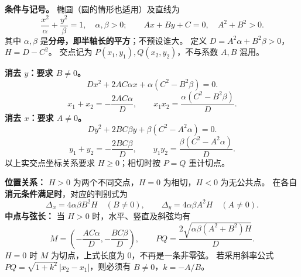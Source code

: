 \begin{statementbox}
\textbf{条件与记号。} 椭圆（圆的情形也适用）及直线为
\[
 \frac{x^2}{\alpha}+\frac{y^2}{\beta}=1,\quad \alpha,\beta>0;
 \qquad Ax+By+C=0,\quad A^2+B^2>0.
\]
其中 $\alpha,\beta$ 是\textbf{分母，即半轴长的平方}；不预设谁大。
定义 $D=A^2\alpha+B^2\beta>0$，$H=D-C^2$。
交点记为 $P(x_1,y_1),Q(x_2,y_2)$，不与系数 $A,B$ 混用。

\textbf{消去 $y$：要求 $B\ne0$。}
\[
 Dx^2+2AC\alpha x+\alpha(C^2-B^2\beta)=0.
\]
\[
 \boxed{x_1+x_2=-\frac{2AC\alpha}{D}},\qquad
 \boxed{x_1x_2=\frac{\alpha(C^2-B^2\beta)}{D}}.
\]
\textbf{消去 $x$：要求 $A\ne0$。}
\[
 Dy^2+2BC\beta y+\beta(C^2-A^2\alpha)=0.
\]
\[
 \boxed{y_1+y_2=-\frac{2BC\beta}{D}},\qquad
 \boxed{y_1y_2=\frac{\beta(C^2-A^2\alpha)}{D}}.
\]
以上实交点坐标关系要求 $H\ge0$；相切时按 $P=Q$ 重计切点。

\textbf{位置关系：} $H>0$ 为两个不同交点，$H=0$ 为相切，$H<0$ 为无公共点。
在各自\textbf{消元条件满足时}，对应的判别式为
\[
 \Delta_x=4\alpha\beta B^2H\quad(B\ne0),\qquad
 \Delta_y=4\alpha\beta A^2H\quad(A\ne0).
\]
\textbf{中点与弦长：} 当 $H>0$ 时，水平、竖直及斜弦均有
\[
 M=\left(-\frac{AC\alpha}{D},-\frac{BC\beta}{D}\right),\qquad
 PQ=\frac{2\sqrt{\alpha\beta(A^2+B^2)H}}{D}.
\]
$H=0$ 时 $M$ 为切点，上式长度为 $0$，不再是一条非零弦。
若采用斜率公式 $PQ=\sqrt{1+k^2}\,|x_2-x_1|$，则必须有 $B\ne0$，$k=-A/B$。
\end{statementbox}
